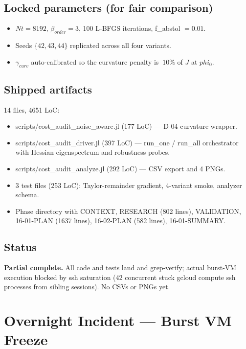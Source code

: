 \documentclass[11pt,letterpaper]{article}
\def\varphi{phi}%
\def\mathrm#1{#1}%
\def\approx{~}%
\def\texttt#1{#1}%
\begin{document}
\subsection{Locked parameters (for fair comparison)}

\begin{itemize}[leftmargin=*]
  \item $\mathrm{Nt} = 8192$, $\beta_{\mathrm{order}} = 3$, 100 L-BFGS iterations, \texttt{f\_abstol $= 0.01$}.
  \item Seeds $\{42, 43, 44\}$ replicated across all four variants.
  \item $\gamma_{\mathrm{curv}}$ auto-calibrated so the curvature penalty is $\approx 10\%$ of $J$ at $\varphi_0$.
\end{itemize}

\subsection{Shipped artifacts}

14 files, 4651 LoC:
\begin{itemize}[leftmargin=*]
  \item \texttt{scripts/cost\_audit\_noise\_aware.jl} (177 LoC) --- D-04 curvature wrapper.
  \item \texttt{scripts/cost\_audit\_driver.jl} (397 LoC) --- \texttt{run\_one} / \texttt{run\_all} orchestrator with Hessian eigenspectrum and robustness probes.
  \item \texttt{scripts/cost\_audit\_analyze.jl} (292 LoC) --- CSV export and 4 PNGs.
  \item 3 test files (253 LoC): Taylor-remainder gradient, 4-variant smoke, analyzer schema.
  \item Phase directory with CONTEXT, RESEARCH (802 lines), VALIDATION, 16-01-PLAN (1637 lines), 16-02-PLAN (582 lines), 16-01-SUMMARY.
\end{itemize}

\subsection{Status}

\textbf{Partial complete.} All code and tests land and grep-verify; actual burst-VM execution blocked by ssh saturation (42 concurrent stuck \texttt{gcloud compute ssh} processes from sibling sessions). No CSVs or PNGs yet.

\newpage
\section{Overnight Incident --- Burst VM Freeze}
\label{sec:incident}
\end{document}
